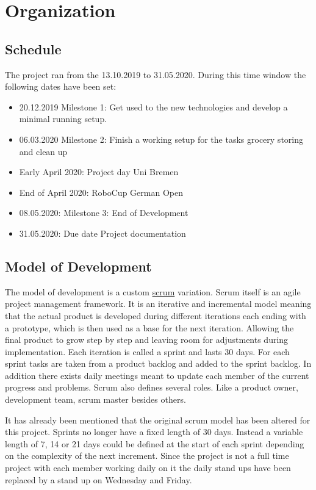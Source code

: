 \documentclass[main.tex]{subfiles}
\begin{document}
	\chapter{Organization}
	\label{organisation}
	
	\section{Schedule}
	The project ran from the 13.10.2019 to 31.05.2020. During this time window the following dates have been set:
	\begin{itemize}
		\item 20.12.2019 Milestone 1: Get used to the new technologies and develop a minimal running setup.
		\item 06.03.2020 Milestone 2: Finish a working setup for the tasks grocery storing and clean up
		\item Early April 2020: Project day Uni Bremen
		\item End of April 2020: RoboCup German Open
		\item 08.05.2020: Milestone 3: End of Development
		\item 31.05.2020: Due date Project documentation
	\end{itemize} 

	\section{Model of Development}
	The model of development is a custom \href{http://projektmanagement-definitionen.de/glossar/scrum/}{scrum} variation. Scrum itself is an agile project management framework. It is an iterative and incremental model meaning that the actual product is developed during different iterations each ending with a prototype, which is then used as a base for the next iteration. Allowing the final product to grow step by step and leaving room for adjustments during implementation. Each iteration is called a sprint and lasts 30 days. For each sprint tasks are taken from a product backlog and added to the sprint backlog. In addition there exists daily meetings meant to update each member of the current progress and problems. Scrum also defines several roles. Like a product owner, development team, scrum master besides others.  
	
	It has already been mentioned that the original scrum model has been altered for this project. Sprints no longer have a fixed length of 30 days. Instead a variable length of 7, 14 or 21 days could be defined at the start of each sprint depending on the complexity of the next increment. Since the project is not a full time project with each member working daily on it the daily stand ups have been replaced by a stand up on Wednesday and Friday. 
	
\end{document}
